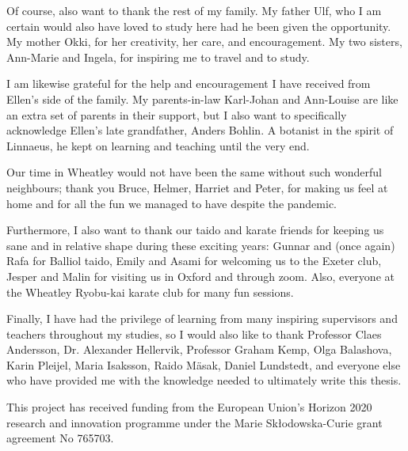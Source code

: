 Of course, also want to thank the rest of my family. My father Ulf, who I am certain would also have loved to study here had he been given the opportunity. My mother Okki, for her creativity, her care, and encouragement. My two sisters, Ann-Marie and Ingela, for inspiring me to travel and to study.

I am likewise grateful for the help and encouragement I have received from Ellen's side of the family. My parents-in-law Karl-Johan and Ann-Louise are like an extra set of parents in their support, but I also want to specifically acknowledge Ellen's late grandfather, Anders Bohlin. A botanist in the spirit of Linnaeus, he kept on learning and teaching until the very end.

Our time in Wheatley would not have been the same without such wonderful neighbours; thank you Bruce, Helmer, Harriet and Peter, for making us feel at home and for all the fun we managed to have despite the pandemic.

Furthermore, I also want to thank our taido and karate friends for keeping us sane and in relative shape during these exciting years: Gunnar and (once again) Rafa for Balliol taido, Emily and Asami for welcoming us to the Exeter club, Jesper and Malin for visiting us in Oxford and through zoom. Also, everyone at the Wheatley Ryobu-kai karate club for many fun sessions.

Finally, I have had the privilege of learning from many inspiring supervisors and teachers throughout my studies, so I would also like to thank Professor Claes Andersson, Dr. Alexander Hellervik, Professor Graham Kemp, Olga Balashova, Karin Pleijel, Maria Isaksson, Raido Mäsak, Daniel Lundstedt, and everyone else who have provided me with the knowledge needed to ultimately write this thesis.




This project has received funding from the European Union's Horizon 2020 research and innovation programme under the Marie Skłodowska-Curie grant agreement No 765703.
